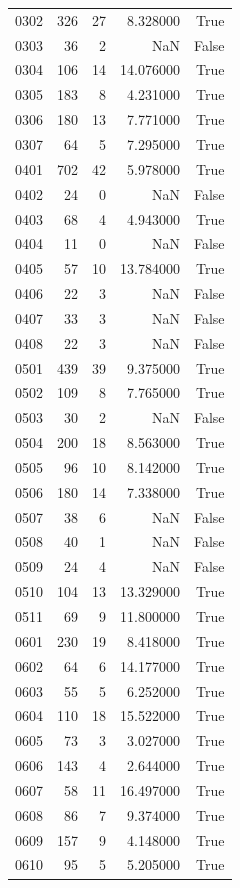\begin{longtable}{lrrrr}
0302 & 326 & 27 & 8.328000 & True \\
0303 & 36 & 2 & NaN & False \\
0304 & 106 & 14 & 14.076000 & True \\
0305 & 183 & 8 & 4.231000 & True \\
0306 & 180 & 13 & 7.771000 & True \\
0307 & 64 & 5 & 7.295000 & True \\
0401 & 702 & 42 & 5.978000 & True \\
0402 & 24 & 0 & NaN & False \\
0403 & 68 & 4 & 4.943000 & True \\
0404 & 11 & 0 & NaN & False \\
0405 & 57 & 10 & 13.784000 & True \\
0406 & 22 & 3 & NaN & False \\
0407 & 33 & 3 & NaN & False \\
0408 & 22 & 3 & NaN & False \\
0501 & 439 & 39 & 9.375000 & True \\
0502 & 109 & 8 & 7.765000 & True \\
0503 & 30 & 2 & NaN & False \\
0504 & 200 & 18 & 8.563000 & True \\
0505 & 96 & 10 & 8.142000 & True \\
0506 & 180 & 14 & 7.338000 & True \\
0507 & 38 & 6 & NaN & False \\
0508 & 40 & 1 & NaN & False \\
0509 & 24 & 4 & NaN & False \\
0510 & 104 & 13 & 13.329000 & True \\
0511 & 69 & 9 & 11.800000 & True \\
0601 & 230 & 19 & 8.418000 & True \\
0602 & 64 & 6 & 14.177000 & True \\
0603 & 55 & 5 & 6.252000 & True \\
0604 & 110 & 18 & 15.522000 & True \\
0605 & 73 & 3 & 3.027000 & True \\
0606 & 143 & 4 & 2.644000 & True \\
0607 & 58 & 11 & 16.497000 & True \\
0608 & 86 & 7 & 9.374000 & True \\
0609 & 157 & 9 & 4.148000 & True \\
0610 & 95 & 5 & 5.205000 & True \\

\end{longtable}
